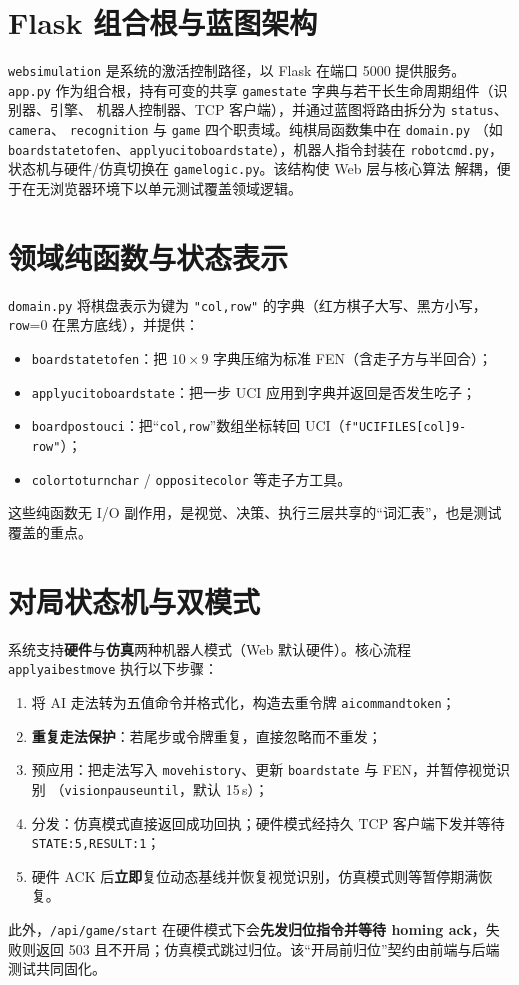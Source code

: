 \documentclass[UTF8, a4paper, 11pt, openany]{ctexbook}
\renewcommand{\_}{\textunderscore\allowbreak}
\begin{document}
\section{Flask 组合根与蓝图架构}
\label{sec:flask}
\texttt{web\_simulation} 是系统的激活控制路径，以 Flask 在端口 5000 提供服务\cite{flask2024}。
\texttt{app.py} 作为组合根，持有可变的共享 \texttt{game\_state} 字典与若干长生命周期组件（识别器、引擎、
机器人控制器、TCP 客户端），并通过蓝图将路由拆分为 \texttt{status}、\texttt{camera}、
\texttt{recognition} 与 \texttt{game} 四个职责域。纯棋局函数集中在 \texttt{domain.py}
（如 \texttt{board\_state\_to\_fen}、\texttt{apply\_uci\_to\_board\_state}），机器人指令封装在
\texttt{robot\_cmd.py}，状态机与硬件/仿真切换在 \texttt{game\_logic.py}。该结构使 Web 层与核心算法
解耦，便于在无浏览器环境下以单元测试覆盖领域逻辑。

\section{领域纯函数与状态表示}
\texttt{domain.py} 将棋盘表示为键为 \texttt{"col,row"} 的字典（红方棋子大写、黑方小写，\texttt{row}=0
在黑方底线），并提供：
\begin{itemize}[itemsep=2pt]
  \item \texttt{board\_state\_to\_fen}：把 $10\times9$ 字典压缩为标准 FEN（含走子方与半回合）；
  \item \texttt{apply\_uci\_to\_board\_state}：把一步 UCI 应用到字典并返回是否发生吃子；
  \item \texttt{board\_pos\_to\_uci}：把“\texttt{col,row}”数组坐标转回 UCI（\texttt{f"{UCI\_FILES[col]}{9-row}"}）；
  \item \texttt{color\_to\_turn\_char} / \texttt{opposite\_color} 等走子方工具。
\end{itemize}
这些纯函数无 I/O 副作用，是视觉、决策、执行三层共享的“词汇表”，也是测试覆盖的重点。

\section{对局状态机与双模式}
\label{sec:dual}
系统支持\textbf{硬件}与\textbf{仿真}两种机器人模式（Web 默认硬件）。核心流程 \texttt{apply\_ai\_best\_move}
执行以下步骤：
\begin{enumerate}[label=(\arabic*)]
  \item 将 AI 走法转为五值命令并格式化，构造去重令牌 \texttt{ai\_command\_token}；
  \item \textbf{重复走法保护}：若尾步或令牌重复，直接忽略而不重发；
  \item 预应用：把走法写入 \texttt{move\_history}、更新 \texttt{board\_state} 与 FEN，并暂停视觉识别
        （\texttt{vision\_pause\_until}，默认 15\,s）；
  \item 分发：仿真模式直接返回成功回执；硬件模式经持久 TCP 客户端下发并等待 \texttt{STATE:5,RESULT:1}；
  \item 硬件 ACK 后\textbf{立即}复位动态基线并恢复视觉识别，仿真模式则等暂停期满恢复。
\end{enumerate}
此外，\texttt{/api/game/start} 在硬件模式下会\textbf{先发归位指令并等待 homing ack}，失败则返回 503
且不开局；仿真模式跳过归位。该“开局前归位”契约由前端与后端测试共同固化。
\end{document}
